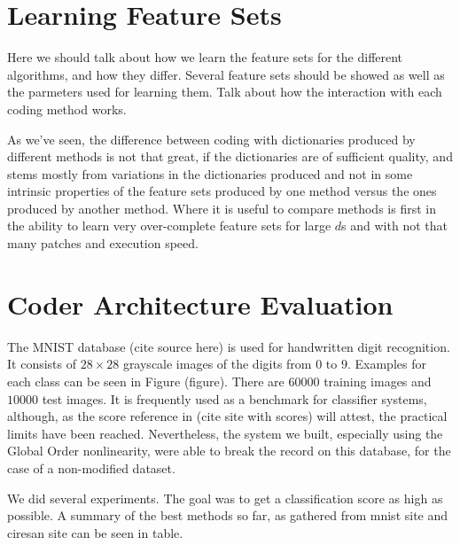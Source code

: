\documentclass[12pt,a4paper,oneside,english]{UPBThesis}
\newcommand{\hctimes}[2]{{#1}\!\times\!{#2}}
\begin{document}
\section{Learning Feature Sets}

Here we should talk about how we learn the feature sets for the different algorithms, and how they differ. Several feature sets should be showed as well as the parmeters used for learning them. Talk about how the interaction with each coding method works.

As we've seen, the difference between coding with dictionaries produced by different methods is not that great, if the dictionaries are of sufficient quality, and stems mostly from variations in the dictionaries produced and not in some intrinsic properties of the feature sets produced by one method versus the ones produced by another method. Where it is useful to compare methods is first in the ability to learn very over-complete feature sets for large $d$s and with not that many patches and execution speed.

\section{Coder Architecture Evaluation}

The MNIST database (cite source here) is used for handwritten digit recognition. It consists of $\hctimes{28}{28}$ grayscale images of the digits from $0$ to $9$. Examples for each class can be seen in Figure (figure). There are $60000$ training images and $10000$ test images. It is frequently used as a benchmark for classifier systems, although, as the score reference in (cite site with scores) will attest, the practical limits have been reached. Nevertheless, the system we built, especially using the Global Order nonlinearity, were able to break the record on this database, for the case of a non-modified dataset.

We did several experiments. The goal was to get a classification score as high as possible. A summary of the best methods so far, as gathered from mnist site and ciresan site can be seen in table.
\end{document}
